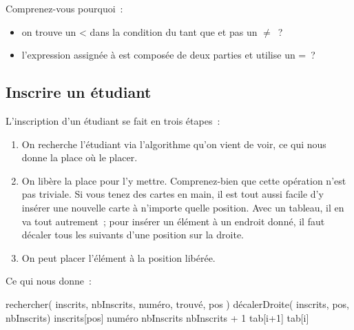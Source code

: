 			Comprenez-vous pourquoi~:
			\begin{itemize}
			\item
				on trouve un < dans la condition du tant que et pas un $\neq$~?
			\item
				l’expression assignée à  est composée de deux parties
				et utilise un =~?
			\end{itemize}

		\subsection{Inscrire un étudiant}
				
			L’inscription d’un étudiant se fait en trois étapes~:
			\begin{enumerate}
			\item
				On recherche l’étudiant via l’algorithme qu’on vient de voir,
				ce qui nous donne la place où le placer.
			\item
				On libère la place pour l’y mettre.
				Comprenez-bien que cette opération n’est pas triviale.
				Si vous tenez des cartes en main, 
				il est tout aussi facile d’y insérer une nouvelle carte
				à n’importe quelle position.
				Avec un tableau,
				il en va tout autrement~;
				pour insérer un élément à un endroit donné,
				il faut décaler tous les suivants d’une position sur la droite.
			\item
				On peut placer l’élément à la position libérée.
			\end{enumerate} 
			
			Ce qui nous donne~:
			
			\begin{LDA}
					\Stmt rechercher( inscrits, nbInscrits, numéro, trouvé, pos )
					\Stmt décalerDroite( inscrits, pos, nbInscrits)
					\Let inscrits[pos] \Gets numéro
					\Let nbInscrits \Gets nbInscrits + 1
				\EndAlgo
				\Empty
						\Let tab[i+1] \Gets tab[i]
					\EndFor
				\EndAlgo
			\end{LDA}
		
